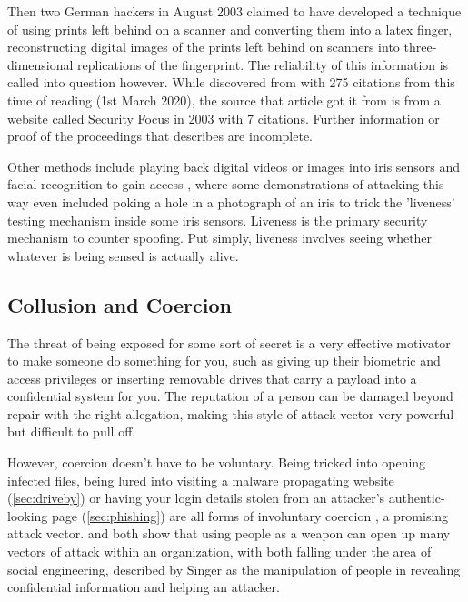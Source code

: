 \documentclass[a4paper, 11pt]{article}
\begin{document}
Then two German hackers in August 2003 claimed to have developed a technique of using prints left behind on a scanner and converting them into a latex finger, reconstructing digital images of the prints left behind on scanners into three-dimensional replications of the fingerprint. \cite{ref:biometricattackvectors,ref:harrison2003hackers} The reliability of this information is called into question however. While discovered from \cite{ref:biometricattackvectors} with 275 citations from this time of reading (1st March 2020), the source that article got it from \cite{ref:harrison2003hackers} is from a website called Security Focus in 2003 with 7 citations. Further information or proof of the proceedings that \cite{ref:harrison2003hackers} describes are incomplete.

Other methods include playing back digital videos or images into iris sensors and facial recognition to gain access \cite{ref:bodybiometrie,ref:biometricattackvectors}, where some demonstrations of attacking this way even included poking a hole in a photograph of an iris to trick the 'liveness' testing mechanism inside some iris sensors. Liveness is the primary security mechanism to counter spoofing. Put simply, liveness involves seeing whether whatever is being sensed is actually alive. \cite{ref:biometricattackvectors}

\subsection{Collusion and Coercion}
\label{sec:coercion}
The threat of being exposed for some sort of secret is a very effective motivator to make someone do something for you, such as giving up their biometric and access privileges \cite{ref:biometricattackvectors} or inserting removable drives that carry a payload into a confidential system for you. The reputation of a person can be damaged beyond repair with the right allegation, making this style of attack vector very powerful but difficult to pull off.

However, coercion doesn't have to be voluntary. Being tricked into opening infected files, being lured into visiting a malware propagating website (\ref{sec:driveby}) or having your login details stolen from an attacker's authentic-looking page (\ref{sec:phishing}) are all forms of involuntary coercion \cite{ref:jang2014survey,ref:singer2014cybersecurity}, a promising attack vector. \cite{ref:biometricattackvectors} and \cite{ref:jang2014survey} both show that using people as a weapon can open up many vectors of attack within an organization, with both falling under the area of social engineering, described by Singer \cite{ref:singer2014cybersecurity} as the manipulation of people in revealing confidential information and helping an attacker.
\end{document}
